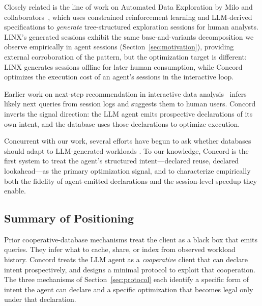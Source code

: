 Closely related is the line of work on Automated Data Exploration by Milo and collaborators~\cite{linx2025,atena2020,atenapro2023}, which uses constrained reinforcement learning and LLM-derived specifications to \emph{generate} tree-structured exploration sessions for human analysts. LINX's generated sessions exhibit the same base-and-variants decomposition we observe empirically in agent sessions (Section~\ref{sec:motivation}), providing external corroboration of the pattern, but the optimization target is different: LINX generates sessions offline for later human consumption, while Concord optimizes the execution cost of an agent's sessions in the interactive loop.

Earlier work on next-step recommendation in interactive data analysis~\cite{react2018} infers likely next queries from session logs and suggests them to human users. Concord inverts the signal direction: the LLM agent emits prospective declarations of its own intent, and the database uses those declarations to optimize execution.

Concurrent with our work, several efforts have begun to ask whether databases should adapt to LLM-generated workloads . To our knowledge, Concord is the first system to treat the agent's structured intent---declared reuse, declared lookahead---as the primary optimization signal, and to characterize empirically both the fidelity of agent-emitted declarations and the session-level speedup they enable.

\subsection{Summary of Positioning}

Prior cooperative-database mechanisms treat the client as a black box that emits queries. They infer what to cache, share, or index from observed workload history. Concord treats the LLM agent as a \emph{cooperative} client that can declare intent prospectively, and designs a minimal protocol to exploit that cooperation. The three mechanisms of Section~\ref{sec:protocol} each identify a specific form of intent the agent can declare and a specific optimization that becomes legal only under that declaration.
